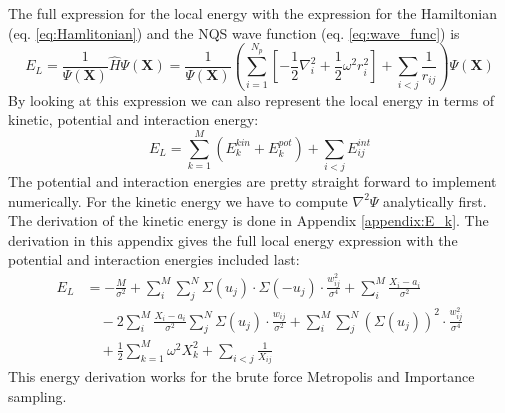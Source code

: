 \documentclass[12pt,a4paper,english]{article}
\begin{document}
The full expression for the local energy with the expression for the Hamiltonian (eq. \ref{eq:Hamlitonian}) and the NQS wave function (eq. \ref{eq:wave_func}) is
\begin{equation}
\label{eq:full_EL}
E_L=\frac{1}{\Psi(\textbf{X})}\hat{H}\Psi(\textbf{X})= \frac{1}{\Psi(\textbf{X})}\left(\sum_{i=1}^{N_p}\left[-\frac{1}{2}\nabla^2_i + \frac{1}{2}\omega^2r_i^2\right] + \sum_{i<j}\frac{1}{r_{ij}}\right)\Psi(\textbf{X})
\end{equation}
By looking at this expression we can also represent the local energy in terms of kinetic, potential and interaction energy:
\begin{equation}
\label{eq:EL_kin_pot_int}
E_L=\sum_{k=1}^{M}(E_k^{kin}+E_k^{pot}) + \sum_{i<j}E_{ij}^{int}
\end{equation}
The potential and interaction energies are pretty straight forward to implement numerically. For the kinetic energy we have to compute $\nabla^2\Psi$ analytically first. The derivation of the kinetic energy is done in Appendix \ref{appendix:E_k}. The derivation in this appendix gives the full local energy expression with the potential and interaction energies included last:
\begin{align}
\label{eq:Full_energy}
E_L&= -\frac{M}{\sigma^2} +\sum_{i}^{M}\sum_{j}^{N}\Sigma(u_j)\cdot\Sigma(-u_j)\cdot\frac{w_{ij}^2}{\sigma^4} +\sum_{i}^{M}\frac{X_i-a_i}{\sigma^2}\nonumber\\ 
&\quad -2\sum_{i}^{M}\frac{X_i-a_i}{\sigma^2}\sum_{j}^{N}\Sigma(u_j)\cdot\frac{w_{ij}}{\sigma^2} 
+\sum_{i}^{M}\sum_{j}^{N}(\Sigma(u_j))^2\cdot\frac{w_{ij}^2}{\sigma^4}\nonumber\\
&\quad +\frac{1}{2}\sum_{k=1}^{M}\omega^2X_k^2 + \sum_{i<j}\frac{1}{X_{ij}}
\end{align}
This energy derivation works for the brute force Metropolis and Importance sampling.
\end{document}
